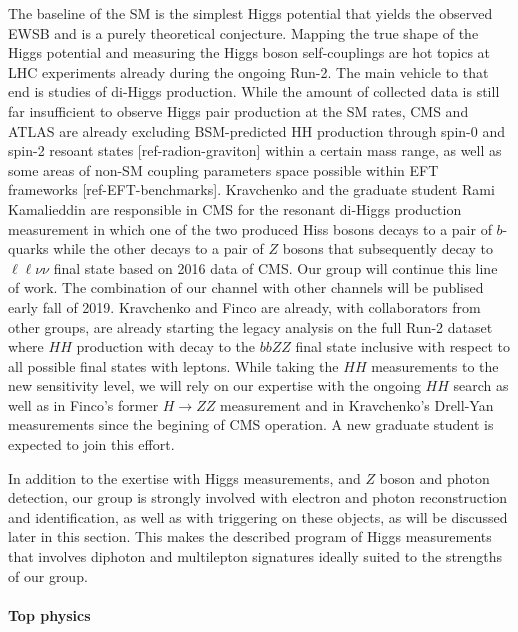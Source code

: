 The baseline of the SM is the simplest Higgs potential that yields the observed EWSB and is a purely theoretical conjecture. Mapping the true shape of the  Higgs potential and measuring the Higgs boson self-couplings are hot topics at LHC experiments already during the ongoing Run-2. The main vehicle to that end is studies of di-Higgs production. While the amount of collected data is still far insufficient to observe Higgs pair production at the SM rates, CMS and ATLAS are already excluding BSM-predicted HH production through spin-0 and spin-2 resoant states [ref-radion-graviton] within a certain mass range, as well as some areas of non-SM coupling parameters space possible within EFT frameworks [ref-EFT-benchmarks]. Kravchenko and the graduate student Rami Kamalieddin are responsible in CMS for the resonant di-Higgs production measurement in which one of the two produced Hiss bosons decays to a pair of $b$-quarks while the other decays to a pair of $Z$ bosons that subsequently
decay to $\ell\ell\nu\nu$ final state based on 2016 data of CMS. Our group will continue this line of work. The combination of our channel with other channels will be publised early fall of 2019. Kravchenko and Finco are already, with collaborators from other groups, are already starting the legacy analysis on the full Run-2 dataset where $HH$ production with decay to the $bbZZ$ final state inclusive with respect to all possible final states with leptons. While taking the $HH$ measurements to the new sensitivity level, we will rely on our expertise with the ongoing $HH$ search as well as in Finco's former $H\to ZZ$ measurement and in Kravchenko's Drell-Yan measurements since the begining of CMS operation. A new graduate student is expected to join this effort.

In addition to the exertise with Higgs measurements, and $Z$ boson and photon detection, our group is strongly involved with electron and photon reconstruction and identification, as well as with triggering on these objects, as will be discussed later in this section. This makes the described program of Higgs measurements that involves diphoton and multilepton signatures ideally suited to the strengths of our group.

\paragraph{Top physics}
%

